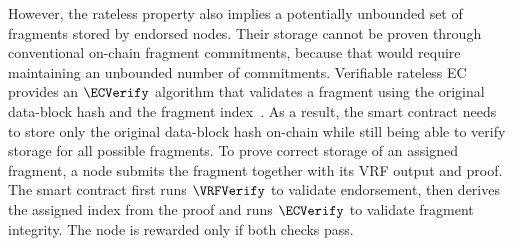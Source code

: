 However, the rateless property also implies a potentially unbounded set of fragments stored by endorsed nodes.
Their storage cannot be proven through conventional on-chain fragment commitments, because that would require maintaining an unbounded number of commitments.
Verifiable rateless EC provides an $\ECVerify$ algorithm that validates a fragment using the original data-block hash and the fragment index~\cite{verify-rateless-ec}.
As a result, the smart contract needs to store only the original data-block hash on-chain while still being able to verify storage for all possible fragments.
To prove correct storage of an assigned fragment, a node submits the fragment together with its VRF output and proof.
The smart contract first runs $\VRFVerify$ to validate endorsement, then derives the assigned index from the proof and runs $\ECVerify$ to validate fragment integrity.
The node is rewarded only if both checks pass.